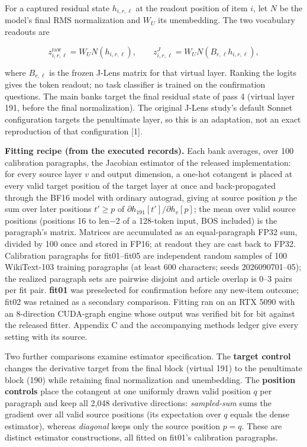 \documentclass[
  british,
  11pt,
  a4paper,
]{article}
\begin{document}
For a captured residual state \(h_{i,r,\ell}\) at the readout position
of item \(i\), let \(N\) be the model's final RMS normalization and
\(W_U\) its unembedding. The two vocabulary readouts are

\[
z^{\mathrm{raw}}_{i,r,\ell}=W_U N(h_{i,r,\ell}), \qquad
z^{J}_{i,r,\ell}=W_U N(B_{r,\ell}h_{i,r,\ell}),
\]

where \(B_{r,\ell}\) is the frozen J-Lens matrix for that virtual layer.
Ranking the logits gives the token readout; no task classifier is
trained on the confirmation questions. The main banks target the final
residual state of pass 4 (virtual layer 191, before the final
normalization). The original J-Lens study's default Sonnet configuration
targets the penultimate layer, so this is an adaptation, not an exact
reproduction of that configuration {[}1{]}.

\textbf{Fitting recipe (from the executed records).} Each bank averages,
over 100 calibration paragraphs, the Jacobian estimator of the released
implementation: for every source layer \(v\) and output dimension, a
one-hot cotangent is placed at every valid target position of the target
layer at once and back-propagated through the BF16 model with ordinary
autograd, giving at source position \(p\) the sum over later positions
\(t' \ge p\) of \(\partial h_{191}[t']/\partial h_v[p]\); the mean over
valid source positions (positions 16 to len−2 of a 128-token input, BOS
included) is the paragraph's matrix. Matrices are accumulated as an
equal-paragraph FP32 sum, divided by 100 once and stored in FP16; at
readout they are cast back to FP32. Calibration paragraphs for
fit01--fit05 are independent random samples of 100 WikiText-103 training
paragraphs (at least 600 characters; seeds 2026090701--05); the realized
paragraph sets are pairwise disjoint and article overlap is 0--3 pairs
per fit pair. \textbf{fit01} was preselected for confirmation before any
new-item outcome; fit02 was retained as a secondary comparison. Fitting
ran on an RTX 5090 with an 8-direction CUDA-graph engine whose output
was verified bit for bit against the released fitter. Appendix C and the
accompanying methods ledger give every setting with its source.

Two further comparisons examine estimator specification. The
\textbf{target control} changes the derivative target from the final
block (virtual 191) to the penultimate block (190) while retaining final
normalization and unembedding. The \textbf{position controls} place the
cotangent at one uniformly drawn valid position \(q\) per paragraph and
keep all 2,048 derivative directions: \emph{sampled-sum} sums the
gradient over all valid source positions (its expectation over \(q\)
equals the dense estimator), whereas \emph{diagonal} keeps only the
source position \(p=q\). These are distinct estimator constructions, all
fitted on fit01's calibration paragraphs.
\end{document}
